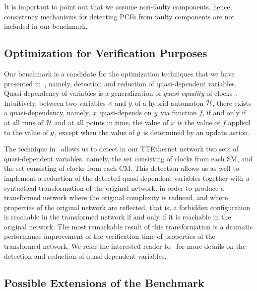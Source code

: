 It is important to point out that we assume non-faulty components, hence, 
consistency mechanisms for detecting PCFs from faulty components are not included in our benchmark.

\subsection{Optimization for Verification Purposes}

Our benchmark is a candidate for the optimization techniques that we have presented in~\cite{Herrera3}, namely,
detection and reduction of quasi-dependent variables. Quasi-dependency of variables is a generalization 
of \emph{quasi-equality} of clocks~\cite{Herrera}. Intuitively, between two variables $x$ and $y$ 
of a hybrid automaton $\mathcal{H}$, there exists a quasi-dependency, namely, $x$ quasi-depends
on $y$ via function $f$, if and only if at all runs of $\mathcal{H}$ and at all points in time,
the value of $x$ is the value of $f$ applied to the value of $y$, except when the value of 
$y$ is determined by an update action. 

The technique in~\cite{Herrera3} allows us to detect in our TTEthernet 
network two sets of quasi-dependent variables, namely,
the set consisting of clocks from each SM, and the set consisting of clocks from each CM. 
This detection allows us as well to implement a reduction of 
the detected quasi-dependent variables together with a syntactical transformation of 
the original network, in order to produce a transformed network where the original complexity is reduced,
and where properties of the original network are reflected, that is, a forbidden configuration is reachable in
the transformed network if and only if it is reachable in the original network. The most remarkable result of this 
transformation is a dramatic performance improvement of the verification time of properties of the transformed network. 
We refer the interested reader to~\cite{Herrera3} for more details on the detection and reduction of quasi-dependent
variables. 

\subsection{Possible Extensions of the Benchmark}

